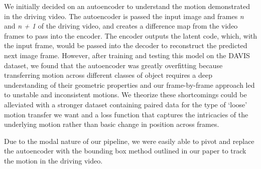 We initially decided on an autoencoder to understand the motion demonstrated in the driving video. The autoencoder is passed the input image and frames \textit{n} and \textit{n + 1} of the driving video, and creates a difference map from the video frames to pass into the encoder. The encoder outputs the latent code, which, with the input frame, would be passed into the decoder to reconstruct the predicted next image frame. However, after training and testing this model on the DAVIS dataset, we found that the autoencoder was greatly overfitting because transferring motion across different classes of object requires a deep understanding of their geometric properties and our frame-by-frame approach led to unstable and inconsistent motions. We theorize these shortcomings could be alleviated with a stronger dataset containing paired data for the type of ‘loose’ motion transfer we want and a loss function that captures the intricacies of the underlying motion rather than basic change in position across frames. 

Due to the modal nature of our pipeline, we were easily able to pivot and replace the autoencoder with the bounding box method outlined in our paper to track the motion in the driving video. 
